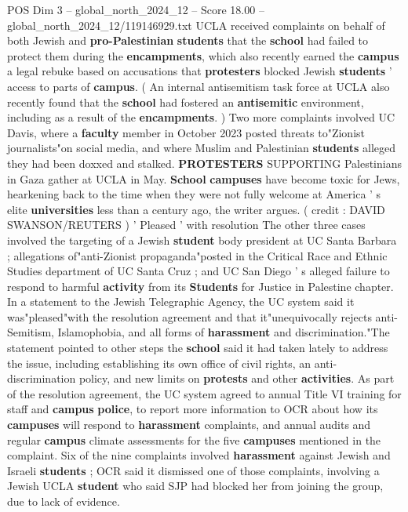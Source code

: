 \begin{textsample}{POS Dim 3 – global\_north\_2024\_12 – Score 18.00 – global\_north\_2024\_12/119146929.txt}
UCLA received complaints on behalf of both Jewish and \textbf{pro-Palestinian} \textbf{students} that the \textbf{school} had failed to protect them during the \textbf{encampments}, which also recently earned the \textbf{campus} a legal rebuke based on accusations that \textbf{protesters} blocked Jewish \textbf{students} ' access to parts of \textbf{campus}. ( An internal antisemitism task force at UCLA also recently found that the \textbf{school} had fostered an \textbf{antisemitic} environment, including as a result of the \textbf{encampments}. ) Two more complaints involved UC Davis, where a \textbf{faculty} member in October 2023 posted threats to"Zionist journalists"on social media, and where Muslim and Palestinian \textbf{students} alleged they had been doxxed and stalked. \textbf{PROTESTERS} SUPPORTING Palestinians in Gaza gather at UCLA in May. \textbf{School} \textbf{campuses} have become toxic for Jews, hearkening back to the time when they were not fully welcome at America ' s elite \textbf{universities} less than a century ago, the writer argues. ( credit : DAVID SWANSON/REUTERS ) ' Pleased ' with resolution The other three cases involved the targeting of a Jewish \textbf{student} body president at UC Santa Barbara ; allegations of"anti-Zionist propaganda"posted in the Critical Race and Ethnic Studies department of UC Santa Cruz ; and UC San Diego ' s alleged failure to respond to harmful \textbf{activity} from its \textbf{Students} for Justice in Palestine chapter.
In a statement to the Jewish Telegraphic Agency, the UC system said it was"pleased"with the resolution agreement and that it"unequivocally rejects anti-Semitism, Islamophobia, and all forms of \textbf{harassment} and discrimination."The statement pointed to other steps the \textbf{school} said it had taken lately to address the issue, including establishing its own office of civil rights, an anti-discrimination policy, and new limits on \textbf{protests} and other \textbf{activities}.
As part of the resolution agreement, the UC system agreed to annual Title VI training for staff and \textbf{campus} \textbf{police}, to report more information to OCR about how its \textbf{campuses} will respond to \textbf{harassment} complaints, and annual audits and regular \textbf{campus} climate assessments for the five \textbf{campuses} mentioned in the complaint.
Six of the nine complaints involved \textbf{harassment} against Jewish and Israeli \textbf{students} ; OCR said it dismissed one of those complaints, involving a Jewish UCLA \textbf{student} who said SJP had blocked her from joining the group, due to lack of evidence.

\end{textsample}
